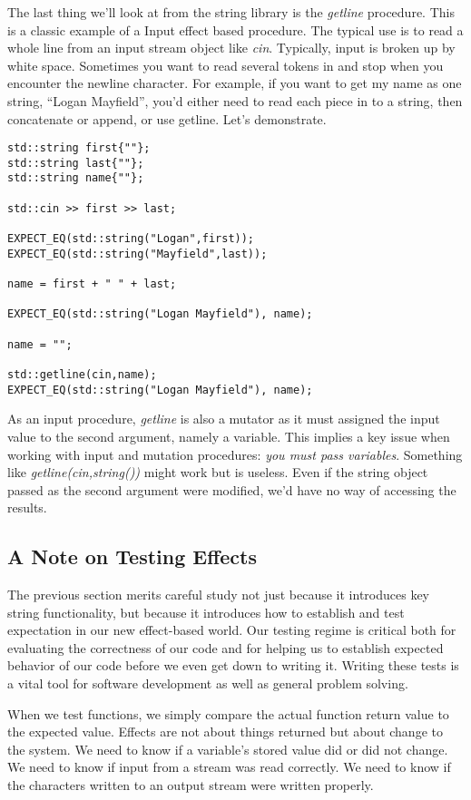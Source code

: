 \documentclass[]{tufte-handout}
\begin{document}
The last thing we'll look at from the string library is the \textit{getline} procedure. This is a classic example of a Input effect based procedure. The typical use is to read a whole line from an input stream object like \textit{cin}.  Typically, input is broken up by white space. Sometimes you want to read several tokens in and stop when you encounter the newline character.  For example, if you want to get my name as one string, ``Logan Mayfield'', you'd either need to read each piece in to a string, then concatenate or append, or use getline. Let's demonstrate.
\begin{verbatim}
std::string first{""};
std::string last{""};
std::string name{""};

std::cin >> first >> last;

EXPECT_EQ(std::string("Logan",first));
EXPECT_EQ(std::string("Mayfield",last));

name = first + " " + last;

EXPECT_EQ(std::string("Logan Mayfield"), name);

name = "";

std::getline(cin,name);
EXPECT_EQ(std::string("Logan Mayfield"), name);
\end{verbatim}
As an input procedure, \textit{getline} is also a mutator as it must assigned the input value to the second argument, namely a variable. This implies a key issue when working with input and mutation procedures: \textit{you must pass variables}. Something like \textit{getline(cin,string())} might work but is useless. Even if the  string object passed as the second argument were modified, we'd have no way of accessing the results. 

\subsection{A Note on Testing Effects}

The previous section merits careful study not just because it introduces key string functionality, but because it introduces how to establish and test expectation in our new effect-based world. Our testing regime is critical both for evaluating the correctness of our code and for helping us to establish expected behavior of our code before we even get down to writing it. Writing these tests is a vital tool for software development as well as general problem solving.

When we test functions, we simply compare the actual function return value to the expected value. Effects are not about things returned but about change to the system. We need to know if a variable's stored value did or did not change. We need to know if input from a stream was read correctly. We need to know if the characters written to an output stream were written properly. 
\end{document}
